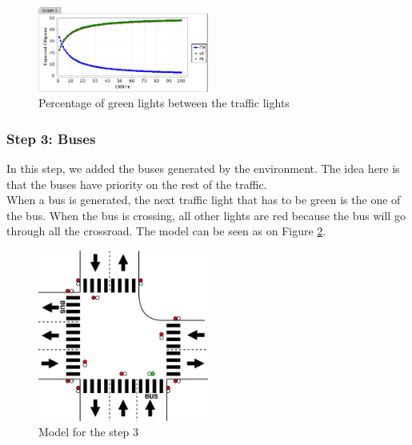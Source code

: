 \begin{figure}[H]\label{fig:prism1}
  \centering
    \includegraphics[width=0.5\textwidth]{picture/graphprism.png}
    \caption{Percentage of green lights between the traffic lights}
\end{figure}


\subsubsection{Step 3: Buses}
In this step, we added the buses generated by the environment. The idea here is that the buses have priority on the rest of the traffic. \\
When a bus is generated, the next traffic light that has to be green is the one of the bus. When the bus is crossing, all other lights are red because the bus will go through all the crossroad. The model can be seen as on Figure \ref{fig:step3bus}. \\

\begin{figure}[H]\label{fig:step3bus}
  \centering
    \includegraphics[width=0.5\textwidth]{picture/model/trafficlight_step3_s2.png}
    \caption{Model for the step 3}
\end{figure}

